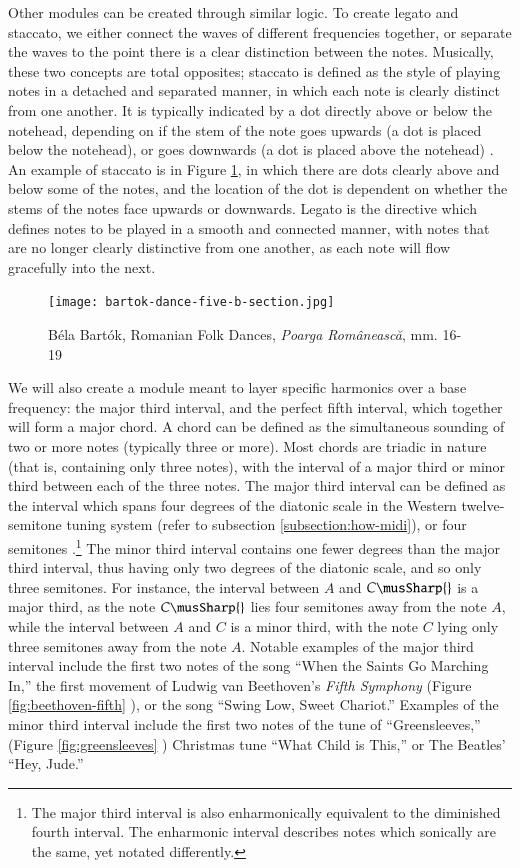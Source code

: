 Other modules can be created through similar logic. To create legato and staccato, we either connect the waves of different frequencies together, or separate the waves to the point there is a clear distinction between the notes. Musically, these two concepts are total opposites; staccato is defined as the style of playing notes in a detached and separated manner, in which each note is clearly distinct from one another. It is typically indicated by a dot directly above or below the notehead, depending on if the stem of the note goes upwards (a dot is placed below the notehead), or goes downwards (a dot is placed above the notehead) \cite{Burkholder_Grout_Palisca_2014}. An example of staccato is in Figure \ref{fig:bartok-dance-five-b-section}, in which there are dots clearly above and below some of the notes, and the location of the dot is dependent on whether the stems of the notes face upwards or downwards. Legato is the directive which defines notes to be played in a smooth and connected manner, with notes that are no longer clearly distinctive from one another, as each note will flow gracefully into the next.

\begin{figure}[h]
  \centering
  \texttt{[image: bartok-dance-five-b-section.jpg]}
  \caption{Béla Bartók, Romanian Folk Dances, \textit{Poarga Românească}, mm. 16-19}
  \label{fig:bartok-dance-five-b-section}
\end{figure}

We will also create a module meant to layer specific harmonics over a base frequency: the major third interval, and the perfect fifth interval, which together will form a major chord. A chord can be defined as the simultaneous sounding of two or more notes (typically three or more). Most chords are triadic in nature (that is, containing only three notes), with the interval of a major third or minor third between each of the three notes. The major third interval can be defined as the interval which spans four degrees of the diatonic scale in the Western twelve-semitone tuning system (refer to subsection \ref{subsection:how-midi}), or four semitones \cite{Nave_2017}.\footnote{The major third interval is also enharmonically equivalent to the diminished fourth interval. The enharmonic interval describes notes which sonically are the same, yet notated differently.} The minor third interval contains one fewer degrees than the major third interval, thus having only two degrees of the diatonic scale, and so only three semitones. For instance, the interval between $A$ and $C\musSharp{}$ is a major third, as the note $C\musSharp{}$ lies four semitones away from the note $A$, while the interval between $A$ and $C$ is a minor third, with the note $C$ lying only three semitones away from the note $A$. Notable examples of the major third interval include the first two notes of the song ``When the Saints Go Marching In,'' the first movement of Ludwig van Beethoven's \textit{Fifth Symphony} (Figure \ref{fig:beethoven-fifth} \cite{Beethoven_1862}), or the song ``Swing Low, Sweet Chariot.'' Examples of the minor third interval include the first two notes of the tune of ``Greensleeves,'' (Figure \ref{fig:greensleeves} \cite{Kurtz_2010}) Christmas tune ``What Child is This,'' or The Beatles' ``Hey, Jude.''

